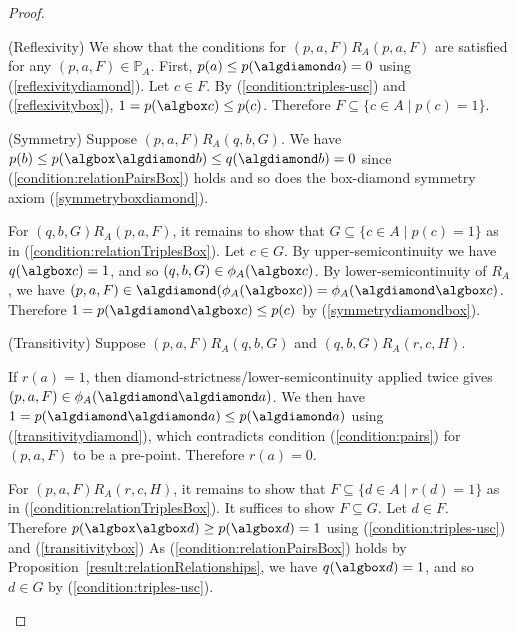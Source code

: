 \documentclass{article}[a4paper]
\theoremstyle{definition}
\newcommand{\Pbb}{\mathbb{P}}
\begin{document}
\begin{proof}
\begin{itemize}
(Reflexivity) We show that the conditions for $(p,a,F) R_A (p,a,F)$ are satisfied for any $(p,a,F) \in \Pbb_A$.  First, $p(a) \leq p(\algdiamond a) = 0$ using (\ref{reflexivitydiamond}). Let $c \in F$. By (\ref{condition:triples-usc}) and (\ref{reflexivitybox}), $1 = p(\algbox c) \leq p(c)$. 
Therefore 
$F \subseteq \{ c \in A \mid p(c)=1 \}$. 

(Symmetry)
    Suppose $(p,a,F)R_A(q,b,G)$. We have $p(b) \leq p(\algbox\algdiamond b) \leq  q (\algdiamond b) = 0$ since (\ref{condition:relationPairsBox}) holds and so does the box-diamond symmetry axiom (\ref{symmetryboxdiamond}). 

    For $(q,b,G)R_A (p,a,F)$, it remains to show that 
    $G \subseteq \{ c \in A \mid p(c) =1 \}$ as in (\ref{condition:relationTriplesBox}). 
    Let $c \in G$. 
    By upper-semicontinuity we have $q(\algbox c) =1$, and so 
    $(q,b,G) \in \phi_A( \algbox c)$. 
    By lower-semicontinuity of $R_A$, we have $(p,a,F) \in \algdiamond (\phi_A( \algbox c)) = \phi_A( \algdiamond \algbox c)$. Therefore $1=p(\algdiamond \algbox c) \leq p(c) $ by (\ref{symmetrydiamondbox}). 

(Transitivity)
    Suppose $(p,a,F) R_A (q,b,G)$ and $(q,b,G) R_A (r,c,H)$. 

    If $r(a)=1$, then diamond-strictness/lower-semicontinuity  applied twice gives 
    $(p,a,F) \in \phi_A (\algdiamond\algdiamond a)$. 
    We then have  
    $1= p(\algdiamond\algdiamond a) \leq p(\algdiamond a)$ using (\ref{transitivitydiamond}), which contradicts condition (\ref{condition:pairs}) for $(p,a,F)$ to be a pre-point. Therefore $r(a)=0$.

    For $(p,a,F)R_A (r,c,H)$, it remains to show that $F\subseteq \{ d \in A \mid r(d) = 1 \}$ as in (\ref{condition:relationTriplesBox}). 
    It suffices to show $F \subseteq G$. Let $d \in F$. Therefore
    $p(\algbox \algbox d) \geq p(\algbox d) =1$ 
    using (\ref{condition:triples-usc}) and (\ref{transitivitybox})
    As (\ref{condition:relationPairsBox}) holds by Proposition~\ref{result:relationRelationships}, we have $q( \algbox d)=1$, and so $d\in G$ by (\ref{condition:triples-usc}).

\end{itemize}
\end{proof}
\end{document}
